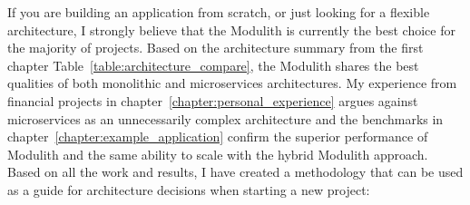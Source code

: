
If you are building an application from scratch, or just looking for a flexible architecture, I strongly believe that the Modulith is currently the best choice for the majority of projects. Based on the architecture summary from the first chapter Table~\ref{table:architecture_compare}, the Modulith shares the best qualities of both monolithic and microservices architectures. My experience from financial projects in chapter~\ref{chapter:personal_experience} argues against microservices as an unnecessarily complex architecture and the benchmarks in chapter~\ref{chapter:example_application} confirm the superior performance of Modulith and the same ability to scale with the hybrid Modulith approach. Based on all the work and results, I have created a methodology that can be used as a guide for architecture decisions when starting a new project:

